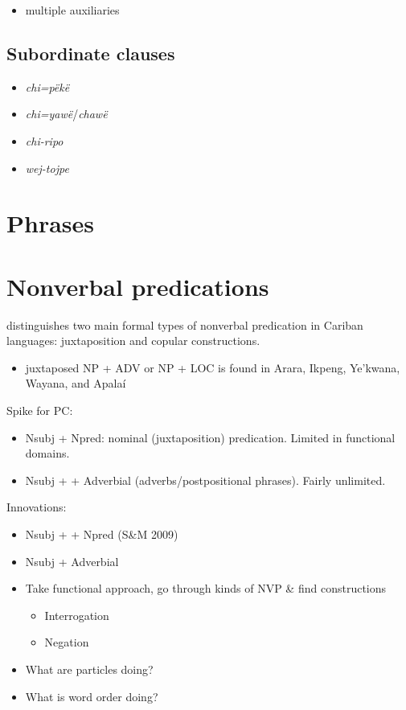 \documentclass{memoir}
\begin{document}
\begin{itemize}
\tightlist
\item
  multiple auxiliaries
\end{itemize}

\section{Subordinate clauses}

\begin{itemize}
\tightlist
\item
  \emph{chi=pëkë}
\item
  \emph{chi=yawë}/\emph{chawë}
\item
  \emph{chi-ripo}
\item
  \emph{wej-tojpe}
\end{itemize}

\chapter{\texorpdfstring{Phrases \label{phrases}}{Phrases }}

\chapter{\texorpdfstring{Nonverbal predications
\label{nonverbal}}{Nonverbal predications }}

\textcites[366]{gildea2018reconstructing} distinguishes two main formal
types of nonverbal predication in Cariban languages: juxtaposition and
copular constructions.

\begin{itemize}
\tightlist
\item
  juxtaposed NP + ADV or NP + LOC is found in Arara, Ikpeng, Ye'kwana,
  Wayana, and Apalaí
\end{itemize}

Spike for PC:

\begin{itemize}
\tightlist
\item
  Nsubj + Npred: nominal (juxtaposition) predication. Limited in
  functional domains.
\item
  Nsubj +  + Adverbial (adverbs/postpositional phrases). Fairly
  unlimited.
\end{itemize}

Innovations:

\begin{itemize}
\item
  Nsubj +  + Npred (S\&M 2009)
\item
  Nsubj + Adverbial
\item
  Take functional approach, go through kinds of NVP \& find
  constructions

  \begin{itemize}
  \tightlist
  \item
    Interrogation
  \item
    Negation
  \end{itemize}
\item
  What are particles doing?
\item
  What is word order doing?
\end{itemize}
\end{document}
